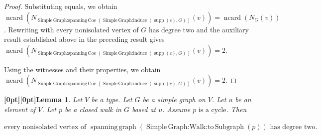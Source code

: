 \documentclass{article}
\makeatletter
\newcommand{\paperanchor}[1]{\hypertarget{#1}{}}%
\def\paperdest{\pdfextension dest}\def\paperstart{\pdfextension startlink}%
\def\paperend{\pdfextension endlink}\def\papercolor{\pdfextension colorstack}%
\let\paperdest\pdfdest\let\paperstart\pdfstartlink\let\paperend\pdfendlink\let\papercolor\pdfcolorstack
\newcommand{\paperanchor}[1]{\paperdest name{#1} xyz}%
\newcommand{\paperanchor}[1]{\special{pdf:dest (#1) [@thispage /XYZ null @ypos null]}}%
\newcommand{\paperlineanchor}[1]{\raisebox{10pt}[0pt][0pt]{\paperanchor{#1}}}
\DeclareRobustCommand{\paperresultname}[1]{\paperlineanchor{theorem:\arabic{theorem}}#1}
\theoremstyle{paperresult}
\newtheorem{lemma}[theorem]{\paperresultname{Lemma}}
\newenvironment{proofstep}{\par\smallskip\ifdim\leftskip<3em\relax\advance\leftskip by 1em\relax\fi\noindent\ignorespaces}{\par\smallskip}
\makeatother
\begin{document}
\begin{proof}
\begin{proofstep}
Substituting equals, we obtain \(\operatorname{ncard}(N_{\operatorname{Simple\,Graph\mathord{:}spanning\,Coe}(\operatorname{Simple\,Graph\mathord{:}induce}(\operatorname{supp}(c),\allowbreak{} G))}(v)) = \operatorname{ncard}(N_{G}(v))\).
Rewriting with \(\text{every nonisolated vertex of }G\text{ has degree two}\) and the auxiliary result established above in the preceding result gives \(\operatorname{ncard}(N_{\operatorname{Simple\,Graph\mathord{:}spanning\,Coe}(\operatorname{Simple\,Graph\mathord{:}induce}(\operatorname{supp}(c),\allowbreak{} G))}(v)) = 2\).
\end{proofstep}
Using the witnesses and their properties, we obtain \(\operatorname{ncard}(N_{\operatorname{Simple\,Graph\mathord{:}spanning\,Coe}(\operatorname{Simple\,Graph\mathord{:}induce}(\operatorname{supp}(c),\allowbreak{} G))}(v)) = 2\).
\end{proof}

\begin{lemma}\label{theorem:33}
Let \(V\) be a type. Let \(G\) be a simple graph on \(V\). Let \(u\) be an element of \(V\). Let \(p\) be a closed walk in \(G\) based at \(u\). Assume \(p\text{ is a cycle}\). Then
\begin{center}
\(\displaystyle \text{every nonisolated vertex of }\operatorname{spanning\,graph}(\operatorname{Simple\,Graph\mathord{:}Walk\mathord{:}to\,Subgraph}(p))\text{ has degree two}.\)
\end{center}
\end{lemma}
\end{document}

